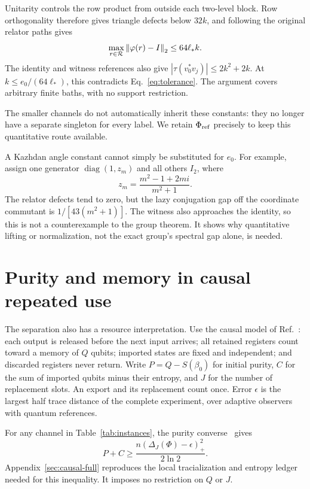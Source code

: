 \documentclass[11pt]{article}
\begin{document}
Unitarity controls the row product from outside each two-level block. Row orthogonality
therefore gives triangle defects below $32k$, and following the original relator paths gives
\[
 \max_{r\in\mathcal R}\left\lVert \varphi(r)-I\right\rVert_2\le64\ell_*k.
\]
The identity and witness references also give
$|\tau(v_0^*v_j)|\le2k^2+2k$. At $k\le e_0/(64\ell_*)$, this contradicts
Eq.~\eqref{eq:tolerance}. The argument covers arbitrary finite baths, with no support
restriction.

The smaller channels do not automatically inherit these constants: they no longer have a
separate singleton for every label. We retain $\Phi_{\mathrm{ref}}$ precisely to keep this
quantitative route available.

A Kazhdan angle constant cannot simply be substituted for $e_0$. For example, assign one
generator $\operatorname{diag}(1,z_m)$ and all others $I_2$, where
\[
 z_m=\frac{m^2-1+2mi}{m^2+1}.
\]
The relator defects tend to zero, but the lazy conjugation gap off the coordinate commutant
is $1/[43(m^2+1)]$. The witness also approaches the identity, so this is not a
counterexample to the group theorem. It shows why quantitative lifting or normalization,
not the exact group's spectral gap alone, is needed.

\section{Purity and memory in causal repeated use}\label{sec:causal}

The separation also has a resource interpretation. Use the causal model of
Ref.~\cite[Definition~2.3]{causal}: each output is released before the next input arrives; all retained
registers count toward a memory of $Q$ qubits; imported states are fixed and independent;
and discarded registers never return. Write $P=Q-S(\beta_0)$ for initial purity,
$C$ for the sum of imported qubits minus their entropy, and $J$ for the number of
replacement slots. An export and its replacement count once. Error $\epsilon$ is the
largest half trace distance of the complete experiment, over adaptive observers with
quantum references.

For any channel in Table~\ref{tab:instances}, the purity converse~\cite[Theorem~3.2(b)]{causal} gives
\begin{equation}
 P+C\ge\frac{n(\Delta_J(\Phi)-\epsilon)_+^2}{2\ln2}.
 \label{eq:purity}
\end{equation}
Appendix~\ref{sec:causal-full} reproduces the local tracialization and entropy ledger needed for this
inequality. It imposes no restriction on $Q$ or $J$.
\end{document}
